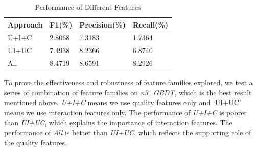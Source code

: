 \documentclass{llncs}
\begin{document}
\begin{table}[htbp]
	\normalsize
	\centering
	\caption{Performance of Different Features}
	\begin{tabular}{|p{80pt}|p{60pt}|p{60pt}|p{60pt}|}
		\hline
		Approach & F1(\%) & Precision(\%) & Recall(\%) \\
		\hline
		U+I+C & 2.8068 & 7.3183 & 1.7364 \\
		UI+UC & 7.4938 & 8.2366 & 6.8740 \\
		\hline
		All & 8.4719 & 8.6591 & 8.2926 \\
		\hline
	\end{tabular}
	\label{tab:fea}
\end{table}

To prove the effectiveness and robustness of feature families explored,
we test a series of combination of feature families on 
\textit{n3\_GBDT}, which is the best result mentioned above.
\textit{U+I+C} means we use quality features only and `UI+UC' means we use interaction
features only.
The performance of \textit{U+I+C} is poorer than \textit{UI+UC}, which explains the importance of interaction features.
The performance of \textit{All} is better than \textit{UI+UC}, which reflects the supporting role of the quality features.


\end{document}
